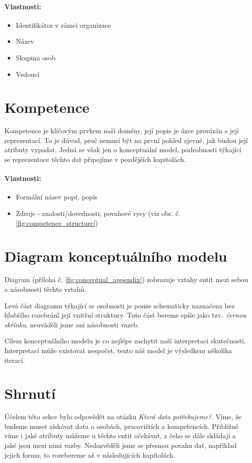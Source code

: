 \paragraph{Vlastnosti:}
\begin{itemize}
\item Identifikátor v rámci organizace
\item Název
\item Skupina osob
\item Vedoucí
\end{itemize}
\section{Kompetence}
Kompetence je klíčovým prvkem naší domény, její popis je úzce provázán s její reprezentací. To je důvod, proč nemusí být na první pohled zjevné, jak budou její atributy vypadat. Jedná se však jen o konceptuální model, podrobnosti týkající se reprezentace těchto dat připojíme v pozdějších kapitolách. \par
\paragraph{Vlastnosti:}
\begin{itemize}
\item Formální název popř. popis
\item Zdroje - znalosti/dovednosti, povahové rysy (viz obr. č. \ref{fig:competence_structure})
\end{itemize}
\section{Diagram konceptuálního modelu}
Diagram (příloha č. \ref{fig:conceptual_appendix}) zobrazuje vztahy entit mezi sebou a násobnosti těchto vztahů. \par
\noindent Levá část diagramu týkající se osobnosti je pouze schematicky naznačena bez hlubšího rozebrání její vnitřní struktury. Tuto část bereme spíše jako tzv.~\textit{černou skřínku}, neuváděli jsme ani násobnosti vazeb.\par
Cílem konceptuálního modelu je co nejlépe zachytit naší interpretaci skutečnosti. Interpretací může existovat nespočet, tento náš model je výsledkem několika iterací.\par
\section{Shrnutí}
Účelem této sekce bylo odpovědět na otázku \textit{Která data potřebujeme?}. Víme, že budeme muset získávat data o osobách, pracovištích a kompetencích. Přibližně víme i jaké atributy můžeme u těchto entit očekávat, z čeho se dále skládají a jaké jsou mezi nimi vazby. Nedozvěděli jsme se přesnou povahu dat, například jejich formu, to rozebereme až v následujících kapitolách.

